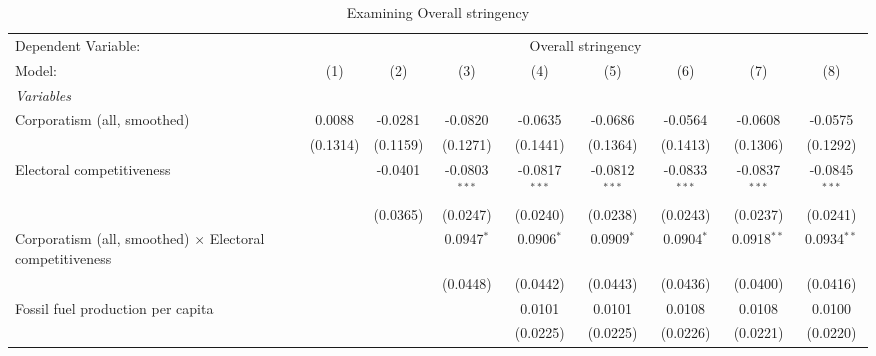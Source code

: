 
\begin{table}[htbp]
   \caption{Examining Overall stringency}
   \centering
   \begin{tabular}{lcccccccc}
      \tabularnewline \midrule \midrule
      Dependent Variable: & \multicolumn{8}{c}{Overall stringency}\\
      Model:                                                          & (1)                   & (2)      & (3)             & (4)             & (5)             & (6)             & (7)             & (8)\\  
      \midrule
      \emph{Variables}\\
      Corporatism (all, smoothed)                                     & 0.0088                & -0.0281  & -0.0820         & -0.0635         & -0.0686         & -0.0564         & -0.0608         & -0.0575\\   
                                                                      & (0.1314)              & (0.1159) & (0.1271)        & (0.1441)        & (0.1364)        & (0.1413)        & (0.1306)        & (0.1292)\\   
      Electoral competitiveness                                       &                       & -0.0401  & -0.0803$^{***}$ & -0.0817$^{***}$ & -0.0812$^{***}$ & -0.0833$^{***}$ & -0.0837$^{***}$ & -0.0845$^{***}$\\   
                                                                      &                       & (0.0365) & (0.0247)        & (0.0240)        & (0.0238)        & (0.0243)        & (0.0237)        & (0.0241)\\   
      Corporatism (all, smoothed) $\times$ Electoral competitiveness  &                       &          & 0.0947$^{*}$    & 0.0906$^{*}$    & 0.0909$^{*}$    & 0.0904$^{*}$    & 0.0918$^{**}$   & 0.0934$^{**}$\\   
                                                                      &                       &          & (0.0448)        & (0.0442)        & (0.0443)        & (0.0436)        & (0.0400)        & (0.0416)\\   
      Fossil fuel production per capita                               &                       &          &                 & 0.0101          & 0.0101          & 0.0108          & 0.0108          & 0.0100\\   
                                                                      &                       &          &                 & (0.0225)        & (0.0225)        & (0.0226)        & (0.0221)        & (0.0220)\\   

\end{tabular}
\end{table}
